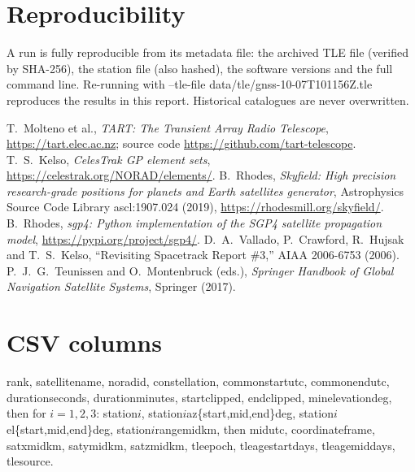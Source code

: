 \documentclass[11pt,a4paper]{article}
\newcommand{\code}[1]{{\ttfamily\def\_{\textunderscore\allowbreak}#1}}
\begin{document}
\section{Reproducibility}

A run is fully reproducible from its metadata file: the archived TLE file
(verified by SHA-256), the station file (also hashed), the software versions
and the full command line. Re-running with
\code{--tle-file data/tle/gnss\_2026-10-07T101156Z.tle} reproduces the
results in this report. Historical catalogues are never overwritten.

\begin{thebibliography}{9}
 T.~Molteno et al., \emph{TART: The Transient Array Radio
Telescope}, \url{https://tart.elec.ac.nz}; source code
\url{https://github.com/tart-telescope}.
 T.~S.~Kelso, \emph{CelesTrak GP element sets},
\url{https://celestrak.org/NORAD/elements/}.
 B.~Rhodes, \emph{Skyfield: High precision research-grade
positions for planets and Earth satellites generator}, Astrophysics Source
Code Library ascl:1907.024 (2019), \url{https://rhodesmill.org/skyfield/}.
 B.~Rhodes, \emph{sgp4: Python implementation of the SGP4
satellite propagation model}, \url{https://pypi.org/project/sgp4/}.
 D.~A.~Vallado, P.~Crawford, R.~Hujsak and T.~S.~Kelso,
``Revisiting Spacetrack Report \#3,'' AIAA 2006-6753 (2006).
 P.~J.~G.~Teunissen and O.~Montenbruck (eds.),
\emph{Springer Handbook of Global Navigation Satellite Systems}, Springer (2017).
\end{thebibliography}

\appendix
\section{CSV columns}
\small
\code{rank, satellite\_name, norad\_id, constellation, common\_start\_utc,
common\_end\_utc, duration\_seconds, duration\_minutes, start\_clipped,
end\_clipped, min\_elevation\_deg}, then for $i=1,2,3$:
\code{station\_$i$, station\_$i$\_az\_\{start,mid,end\}\_deg,
station\_$i$\_el\_\{start,mid,end\}\_deg, station\_$i$\_range\_mid\_km}, then
\code{mid\_utc, coordinate\_frame, sat\_x\_mid\_km, sat\_y\_mid\_km,
sat\_z\_mid\_km, tle\_epoch, tle\_age\_start\_days, tle\_age\_mid\_days,
tle\_source}.
\end{document}
